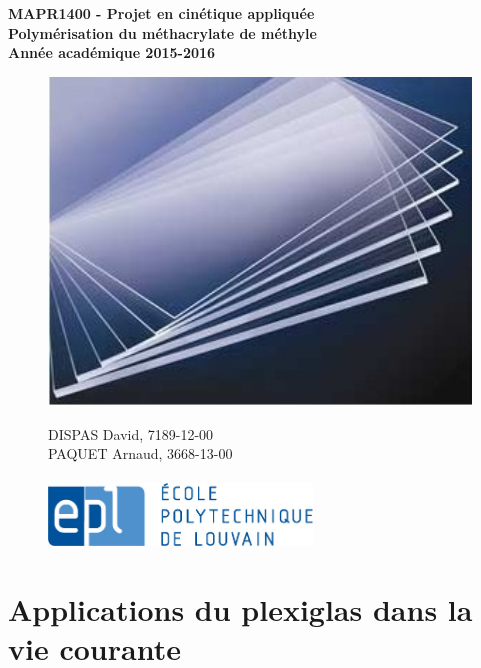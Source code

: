 \documentclass[a4paper,oneside,12pt]{article}
\begin{document}
\begin{titlepage}

\begin{center}
\Huge
\textbf{MAPR1400 - Projet en cinétique appliquée\\}
\vspace{0.5cm}
\huge
\textbf{Polymérisation du méthacrylate de méthyle\\}
\Large
\vspace{0.5cm}
\textbf{Année académique 2015-2016\\}
\begin{figure}[b!]
	\center
	\includegraphics[width=12cm]{Images/plexi.jpg}
\end{figure}

\end{center}
\begin{figure}[b!]
\begin{Large}
\end{Large}
	DISPAS David, 7189-12-00\\
	PAQUET Arnaud, 3668-13-00\\
	\\
	\newline
	\center
	\includegraphics[width=7cm]{Images/epl-logo.jpg}
\end{figure}
\end{titlepage}

\section{Applications du plexiglas dans la vie courante}
\end{document}
